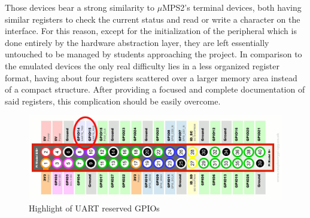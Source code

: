 \documentclass[12pt,a4paper,openright,twoside]{report}
\begin{document}
Those devices bear a strong similarity to $\mu$MPS2's terminal devices, both having 
similar registers to check the current status and read or write a character on the
interface. For this reason, except for the initialization of the peripheral
which is done entirely by the hardware abstraction layer, they are left essentially
 untouched to be managed by students approaching the project. In comparison to 
 the emulated devices the only real difficulty lies in a less organized register
 format, having about four registers scattered over a larger memory area instead
 of a compact structure. After providing a focused and complete documentation of 
 said registers, this complication should be easily overcome.

 \begin{figure}[t]
 \includegraphics[scale=0.143]{images/tesi2.jpg}
 \caption[Raspberry Pi UART pins]{Highlight of UART reserved GPIOs}\label{fig:seconda}
 \end{figure}
\end{document}
